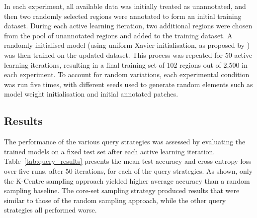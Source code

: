 In each experiment, all available data was initially treated as unannotated, and then two randomly selected regions were annotated to form an initial training dataset. During each active learning iteration, two additional regions were chosen from the pool of unannotated regions and added to the training dataset. A randomly initialised model (using uniform Xavier initialisation, as proposed by \cite{glorot2010understanding}) was then trained on the updated dataset. This process was repeated for 50 active learning iterations, resulting in a final training set of 102 regions out of 2,500 in each experiment. To account for random variations, each experimental condition was run five times, with different seeds used to generate random elements such as model weight initialisation and initial annotated patches.

\subsection{Results}
\label{subsec:active_results}
The performance of the various query strategies was assessed by evaluating the trained models on a fixed test set after each active learning iteration. Table~\ref{tab:query_results} presents the mean test accuracy and cross-entropy loss over five runs, after 50 iterations, for each of the query strategies. As shown, only the K-Centre sampling approach yielded higher average accuracy than a random sampling baseline. The core-set sampling strategy produced results that were similar to those of the random sampling approach, while the other query strategies all performed worse.

\begin{table}[h]
	\centering
	\caption{Test results for each query strategy after 50 active iterations.}
	\label{tab:query_results}
\end{table}

